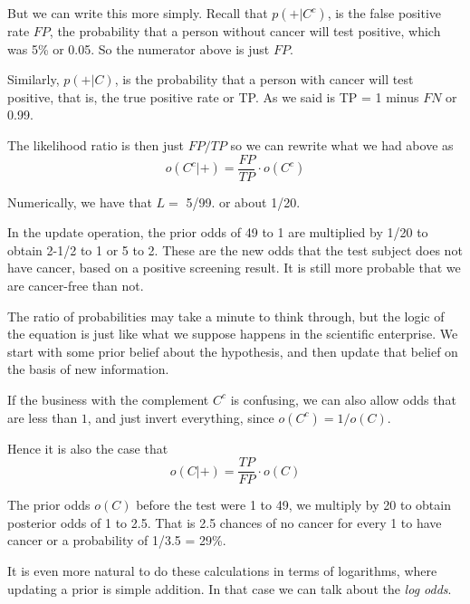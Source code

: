 \documentclass[11pt, oneside]{article}
\begin{document}
But we can write this more simply.  Recall that $p(+|C^c)$, is the false positive rate $FP$, the probability that a person without cancer will test positive, which was 5\% or 0.05.  So the numerator above is just $FP$.

Similarly, $p(+|C)$, is the probability that a person with cancer will test positive, that is, the true positive rate or TP.  As we said is TP = 1 minus $FN$ or 0.99.  

The likelihood ratio is then just $FP/TP$ so we can rewrite what we had above as
\[ o(C^c|+) = \frac{FP}{TP} \cdot o(C^c) \]

Numerically, we have that $L = $ 5/99. or about 1/20.  

In the update operation, the prior odds of 49 to 1 are multiplied by 1/20 to obtain 2-1/2 to 1 or 5 to 2.  These are the new odds that the test subject does not have cancer, based on a positive screening result.  It is still more probable that we are cancer-free than not.

The ratio of probabilities may take a minute to think through, but the logic of the equation is just like what we suppose happens in the scientific enterprise.  We start with some prior belief about the hypothesis, and then update that belief on the basis of new information.

If the business with the complement $C^c$ is confusing, we can also allow odds that are less than $1$, and just invert everything, since $o(C^c) = 1/o(C)$.  

Hence it is also the case that
\[ o(C|+) = \frac{TP}{FP} \cdot o(C) \]

The prior odds $o(C)$ before the test were 1 to 49, we multiply by 20 to obtain posterior odds of 1 to 2.5.  That is 2.5 chances of no cancer for every 1 to have cancer or a probability of 1/3.5 = 29\%.

It is even more natural to do these calculations in terms of logarithms, where updating a prior is simple addition.  In that case we can talk about the \emph{log odds}.
\end{document}
